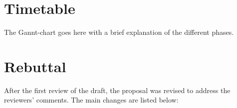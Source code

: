 \documentclass[10pt]{article}
\begin{document}
\section*{Timetable}\label{sec:timetable}
The Gannt-chart goes here with a brief explanation of the different phases.
\printbibliography%

\section*{Rebuttal}\label{sec:rebuttal}
After the first review of the draft, the proposal was revised to address the
reviewers' comments. The main changes are listed below:

\end{document}
